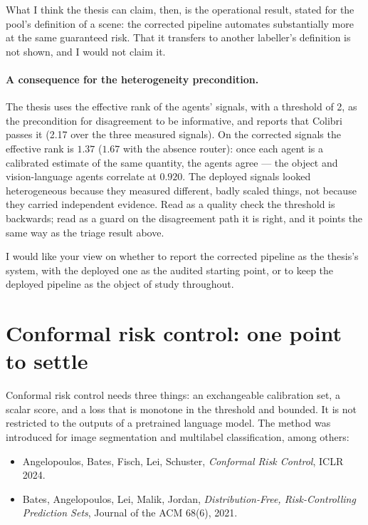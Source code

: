 \documentclass[11pt,a4paper]{article}
\begin{document}
What I think the thesis can claim, then, is the operational result, stated for the pool's definition
of a scene: the corrected pipeline automates substantially more at the same guaranteed risk. That it
transfers to another labeller's definition is not shown, and I would not claim it.

\paragraph{A consequence for the heterogeneity precondition.} The thesis uses the effective rank of
the agents' signals, with a threshold of 2, as the precondition for disagreement to be informative, and
reports that Colibri passes it (2.17 over the three measured signals). On the corrected signals the
effective rank is $1.37$ ($1.67$ with the absence router): once each agent is a calibrated estimate of
the same quantity, the agents agree --- the object and vision-language agents correlate at $0.920$.
The deployed signals looked heterogeneous because they measured different, badly scaled things, not
because they carried independent evidence. Read as a quality check the threshold is backwards; read as
a guard on the disagreement path it is right, and it points the same way as the triage result above.

I would like your view on whether to report the corrected pipeline as the thesis's system, with the
deployed one as the audited starting point, or to keep the deployed pipeline as the object of study
throughout.

\section{Conformal risk control: one point to settle}

Conformal risk control needs three things: an exchangeable calibration set, a scalar score, and a loss
that is monotone in the threshold and bounded. It is not restricted to the outputs of a pretrained
language model. The method was introduced for image segmentation and multilabel classification, among
others:

\begin{itemize}
\item Angelopoulos, Bates, Fisch, Lei, Schuster, \emph{Conformal Risk Control}, ICLR 2024.
\item Bates, Angelopoulos, Lei, Malik, Jordan, \emph{Distribution-Free, Risk-Controlling Prediction
      Sets}, Journal of the ACM 68(6), 2021.
\end{itemize}
\end{document}
